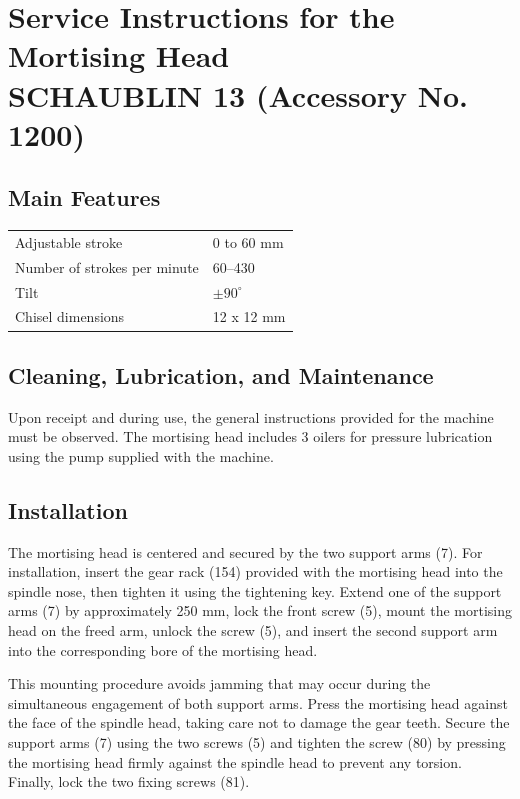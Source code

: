 \chapter{Service Instructions for the Mortising Head \\
SCHAUBLIN 13 \small(Accessory No. 1200)}


\section*{Main Features}

\begin{tabular}{@{}ll@{}}
    Adjustable stroke            & 0 to 60 mm      \\
    Number of strokes per minute & 60--430         \\
    Tilt                         & \(\pm90^\circ\) \\
    Chisel dimensions            & 12 x 12 mm      \\
\end{tabular}

\section*{Cleaning, Lubrication, and Maintenance}
Upon receipt and during use, the general instructions provided for the machine must be observed.
The mortising head includes 3 oilers for pressure lubrication using the pump supplied with the machine.

\section*{Installation}
The mortising head is centered and secured by the two support arms (7).
For installation, insert the gear rack (154) provided with the mortising head into the spindle nose, then tighten it using the tightening key.
Extend one of the support arms (7) by approximately 250 mm, lock the front screw (5), mount the mortising head on the freed arm, unlock the screw (5), and insert the second support arm into the corresponding bore of the mortising head.

This mounting procedure avoids jamming that may occur during the simultaneous engagement of both support arms.
Press the mortising head against the face of the spindle head, taking care not to damage the gear teeth.
Secure the support arms (7) using the two screws (5) and tighten the screw (80) by pressing the mortising head firmly against the spindle head to prevent any torsion.
Finally, lock the two fixing screws (81).

